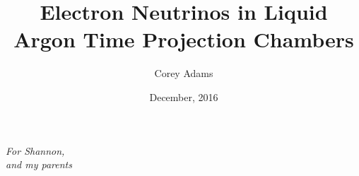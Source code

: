 


\title{Electron Neutrinos in Liquid Argon Time Projection Chambers}
\author{Corey Adams}
\date{December, 2016} %

\frontmatter



\maketitle


\newpage \vspace*{8cm}
\thispagestyle{empty}
\begin{center}
  \Large \emph{For Shannon, \\ and my parents}
\end{center}





\tableofcontents
\listoffigures %
\listoftables %